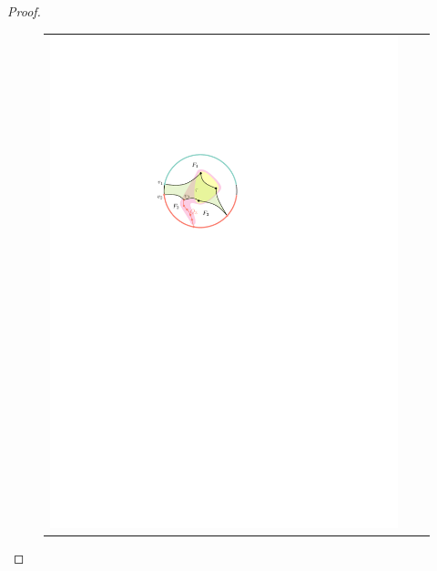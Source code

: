 \documentclass{patmorin}
\theoremstyle{plain}
\theoremstyle{definition}
\begin{document}
\begin{proof}
\begin{figure}[!b]
\begin{center}
\begin{tabular}{c@{}c@{}c}
        \includegraphics{figs/zoomba-2} &

\end{tabular}
\end{center}
\end{figure}
\end{proof}
\end{document}
